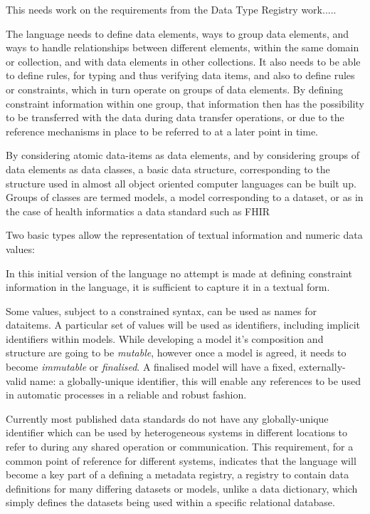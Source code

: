 \documentclass{article}
\begin{document}
		This needs work on the requirements from the Data Type Registry work.....
		
		The language needs to define data elements, ways to group data elements, and ways to handle relationships between different elements, within the same domain or collection, and with data elements in other collections. It also needs to be able to define rules, for typing and thus verifying data items, and also to define rules or constraints, which in turn operate on groups of data elements. By defining constraint information within one group, that information then has the possibility to be transferred with the data during data transfer operations, or due to the reference mechanisms in place to be referred to at a later point in time.
		
		By considering atomic data-items as data elements, and by considering groups of data elements as data classes, a basic data structure, corresponding to the structure used in almost all object oriented computer languages can be built up. Groups of classes are termed models, a model corresponding to a dataset, or as in the case of health informatics a data standard such as FHIR~\cite{FHIR}
		
		Two basic types allow the representation of textual information and numeric data values:
		\begin{zed}
		\end{zed}
		In this initial version of the language no attempt is made at defining constraint information in the language, it is sufficient to capture it in a textual form.
		
		Some values, subject to a constrained syntax, can be used as names for dataitems.  A particular set of values will be used as identifiers, including implicit identifiers within models. While developing a model it's composition and structure are going to be \emph{mutable}, however once a model is agreed, it needs to become \emph{immutable} or \emph{finalised}.  A finalised model will have a fixed, externally-valid name: a globally-unique identifier, this will enable any references to be used in automatic processes in a reliable and robust fashion. 
		
		Currently most published data standards do not have any globally-unique identifier which can be used by heterogeneous systems in different locations to refer to during any shared operation or communication. This requirement, for a common point of reference for different systems, indicates that the language will become a key part of a defining a metadata registry, a registry to contain data definitions for many differing datasets or models, unlike a data dictionary, which simply defines the datasets being used within a specific relational database.
		
\end{document}
